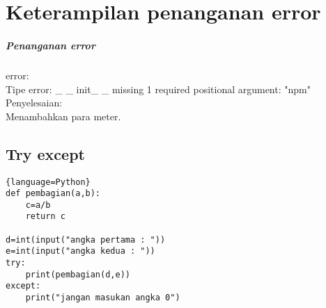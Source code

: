 \chapter*{Keterampilan penanganan error}
\paragraph{Penanganan error}
error:\\
Tipe error: \_ \_ init\_ \_ missing 1 required positional argument: "npm"\\
Penyelesaian:\\
Menambahkan para meter.\\

\section*{Try except}
\begin{lstlisting}{language=Python}
def pembagian(a,b):
    c=a/b
    return c

d=int(input("angka pertama : "))
e=int(input("angka kedua : "))
try:
    print(pembagian(d,e))
except:
    print("jangan masukan angka 0")
\end{lstlisting}
